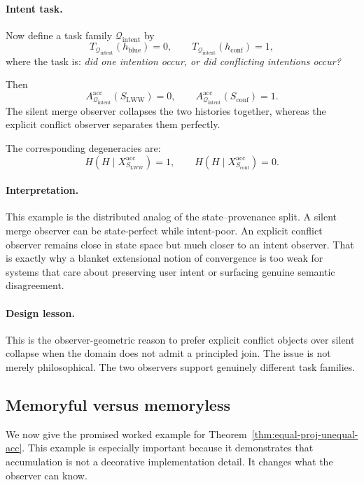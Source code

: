 \documentclass[11pt,twoside]{article}
\theoremstyle{definition}
\newcommand{\acc}{\mathrm{acc}}
\begin{document}
\paragraph{Intent task.}
Now define a task family \(\mathcal{Q}_{\mathrm{intent}}\) by
\[
  T_{\mathcal{Q}_{\mathrm{intent}}}(h_{\mathrm{blue}})=0,
  \qquad
  T_{\mathcal{Q}_{\mathrm{intent}}}(h_{\mathrm{conf}})=1,
\]
where the task is: \emph{did one intention occur, or did conflicting intentions occur?}

Then
\[
  A^{\acc}_{\mathcal{Q}_{\mathrm{intent}}}(S_{\mathrm{LWW}})=0,
  \qquad
  A^{\acc}_{\mathcal{Q}_{\mathrm{intent}}}(S_{\mathrm{conf}})=1.
\]
The silent merge observer collapses the two histories together, whereas the explicit conflict observer separates them perfectly.

The corresponding degeneracies are:
\[
  H(H\mid X_{S_{\mathrm{LWW}}}^{\acc})=1,
  \qquad
  H(H\mid X_{S_{\mathrm{conf}}}^{\acc})=0.
\]

\paragraph{Interpretation.}
This example is the distributed analog of the state--provenance split. A silent merge observer can be state-perfect while intent-poor. An explicit conflict observer remains close in state space but much closer to an intent observer. That is exactly why a blanket extensional notion of convergence is too weak for systems that care about preserving user intent or surfacing genuine semantic disagreement.

\paragraph{Design lesson.}
This is the observer-geometric reason to prefer explicit conflict objects over silent collapse when the domain does not admit a principled join. The issue is not merely philosophical. The two observers support genuinely different task families.

\subsection{Memoryful versus memoryless}
\label{subsec:memoryful-vs-memoryless}

We now give the promised worked example for Theorem~\ref{thm:equal-proj-unequal-acc}. This example is especially important because it demonstrates that accumulation is not a decorative implementation detail. It changes what the observer can know.
\end{document}
